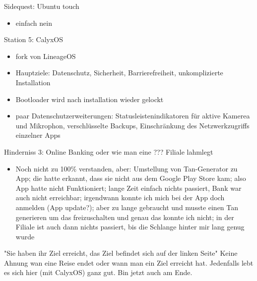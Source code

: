 \documentclass[14pt,compress,usenames,dvipsnames,aspectratio=169]{beamer}
\begin{document}
\begin{frame}{Sidequest: Ubuntu touch}
    \begin{itemize}
        \item einfach nein
    \end{itemize}

\end{frame}

\begin{frame}{Station 5: CalyxOS}
    \begin{itemize}
        \item fork von LineageOS
        \item Hauptziele: Datenschutz, Sicherheit, Barrierefreiheit, unkomplizierte Installation
        \item Bootloader wird nach installation wieder gelockt
        \item paar Datenschutzerweiterungen: Statusleistenindikatoren für aktive Kamerea und Mikrophon, verschlüsselte Backups, Einschränkung des Netzwerkzugriffs einzelner Apps
    \end{itemize}

\end{frame}

\begin{frame}{Hinderniss 3: Online Banking}
    oder wie man eine ??? Filiale lahmlegt
    \begin{itemize}
        \item Noch nicht zu 100\% verstanden, aber: Umstellung von Tan-Generator zu App; die hatte erkannt, dass sie nicht aus dem Google Play Store kam; also App hatte nicht Funktioniert; lange Zeit einfach nichts passiert, Bank war auch nicht erreichbar; irgendwann konnte ich mich bei der App doch anmelden (App update?); aber zu lange gebraucht und musste einen Tan generieren um das freizuschalten und genau das konnte ich nicht; in der Filiale ist auch dann nichts passiert, bis die Schlange hinter mir lang genug wurde
    \end{itemize}

\end{frame}

\begin{frame}{
    "Sie haben ihr Ziel erreicht, das Ziel befindet sich auf der linken Seite"}
    Keine Ahnung wan eine Reise endet oder wann man ein Ziel erreicht hat. 
    Jedenfalls lebt es sich hier (mit CalyxOS) ganz gut.
    Bin jetzt auch am Ende.

\end{frame}
\end{document}
